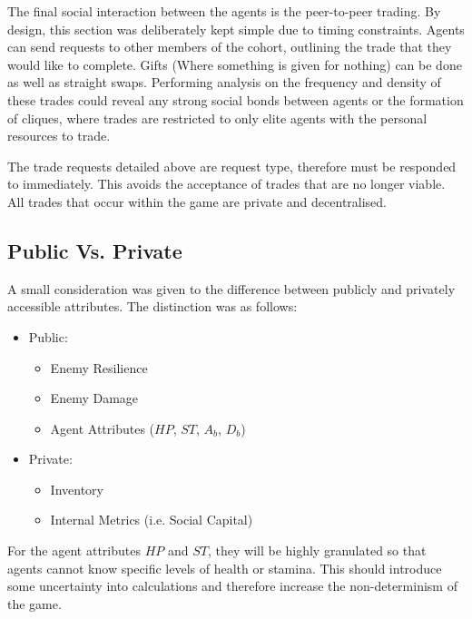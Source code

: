 
The final social interaction between the agents is the peer-to-peer trading. By design, this section was deliberately kept simple due to timing constraints. Agents can send requests to other members of the cohort, outlining the trade that they would like to complete. Gifts (Where something is given for nothing) can be done as well as straight swaps. Performing analysis on the frequency and density of these trades could reveal any strong social bonds between agents or the formation of cliques, where trades are restricted to only elite agents with the personal resources to trade. 

The trade requests detailed above are request type, therefore must be responded to immediately. This avoids the acceptance of trades that are no longer viable. All trades that occur within the game are private and decentralised. 


\subsection{Public Vs. Private}\label{sec:pubpiv}

A small consideration was given to the difference between publicly and privately accessible attributes. The distinction was as follows:

\begin{itemize}
    \item Public:
    \begin{itemize}
        \item Enemy Resilience 
        \item Enemy Damage
        \item Agent Attributes ($HP$, $ST$, $A_b$, $D_b$)
    \end{itemize}
    \item Private:
    \begin{itemize}
        \item Inventory
        \item Internal Metrics (i.e. Social Capital)
    \end{itemize}
\end{itemize}

For the agent attributes $HP$ and $ST$, they will be highly granulated so that agents cannot know specific levels of health or stamina. This should introduce some uncertainty into calculations and therefore increase the non-determinism of the game. 

